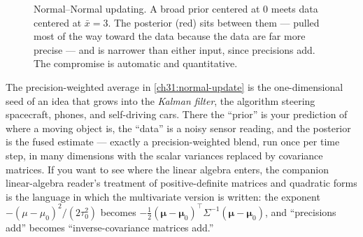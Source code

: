 \begin{figure}[H]
\centering
{}
\caption{Normal--Normal updating. A broad prior centered at $0$ meets data centered at
$\bar x = 3$. The posterior (red) sits between them --- pulled most of the way toward the
data because the data are far more precise --- and is narrower than either input, since
precisions add. The compromise is automatic and quantitative.}
\label{ch31:fig-normalnormal}
\end{figure}

\begin{connectionbox}
The precision-weighted average in \eqref{ch31:normal-update} is the one-dimensional seed of
an idea that grows into the \emph{Kalman filter}, the algorithm steering spacecraft,
phones, and self-driving cars. There the ``prior'' is your prediction of where a moving
object is, the ``data'' is a noisy sensor reading, and the posterior is the fused estimate
--- exactly a precision-weighted blend, run once per time step, in many dimensions with the
scalar variances replaced by covariance matrices. If you want to see where the linear
algebra enters, the companion linear-algebra reader's treatment of positive-definite
matrices and quadratic forms is the language in which the multivariate version is written:
the exponent $-(\mu-\mu_0)^2/(2\tau_0^2)$ becomes $-\tfrac12(\boldsymbol\mu -
\boldsymbol\mu_0)^\top \Sigma^{-1}(\boldsymbol\mu - \boldsymbol\mu_0)$, and ``precisions
add'' becomes ``inverse-covariance matrices add.''
\end{connectionbox}

